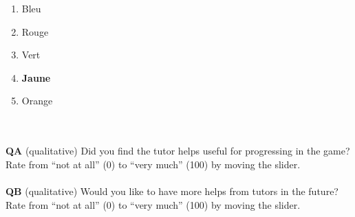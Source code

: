 \documentclass[14pt]{extarticle}
\begin{document}
\begin{enumerate}[label=\alph*)]
    \item Bleu
    \item Rouge
    \item Vert
    \item \textbf{Jaune}
    \item Orange
\end{enumerate}
\\
\\
\textbf{QA} (qualitative)
Did you find the tutor helps useful for progressing in the game?
Rate from “not at all” (0) to “very much” (100) by moving the slider.\\
\\
\textbf{QB} (qualitative)
Would you like to have more helps from tutors in the future?
Rate from “not at all” (0) to “very much” (100) by moving the slider.
\end{document}
